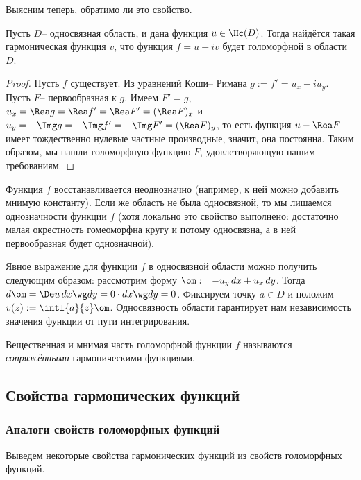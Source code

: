 \documentclass[a4paper]{article}
\begin{document}
Выясним теперь, обратимо ли это свойство.

\begin{stm}
Пусть $D$-- односвязная область, и дана функция $u\in \Hc(D)$. Тогда найдётся такая гармоническая функция $v$,
что функция $f = u+iv$ будет голоморфной в области $D$.
\end{stm}
\begin{proof}
Пусть $f$ существует. Из уравнений Коши-- Римана $g := f' = u_x-iu_y$. Пусть $F$-- первообразная к $g$. Имеем
$F'=g$, $u_x=\Rea g = \Rea f'= \Rea F'=(\Rea F)_x$ и $u_y=-\Img g= -\Img f'= -\Img F'=(\Rea F)_y$, то есть
функция $u - \Rea F$ имеет тождественно нулевые частные производные, значит, она постоянна. Таким образом, мы
нашли голоморфную функцию $F$, удовлетворяющую нашим требованиям.
\end{proof}

\begin{note}
Функция $f$ восстанавливается неоднозначно (например, к ней можно добавить мнимую константу). Если же область не
была односвязной, то мы лишаемся однозначности функции $f$ (хотя локально это свойство выполнено: достаточно
малая окрестность гомеоморфна кругу и потому односвязна, а в ней первообразная будет однозначной).
\end{note}

Явное выражение для функции $f$ в односвязной области можно получить следующим образом:
рассмотрим форму $\om := -u_y \, dx + u_x\, dy$. Тогда $d\om = \De u \, dx \wg dy = 0 \cdot dx \wg dy = 0$.
Фиксируем точку $a \in D$ и положим $v(z) := \intl{a}{z}\om$. Односвязность области гарантирует нам независимость
значения функции от пути интегрирования.

\begin{df}
Вещественная и мнимая часть голоморфной функции $f$ называются \emph{сопряжёнными} гармоническими функциями.
\end{df}

\subsection{Свойства гармонических функций}

\subsubsection{Аналоги свойств голоморфных функций}

Выведем некоторые свойства гармонических функций из свойств голоморфных функций.
\end{document}
